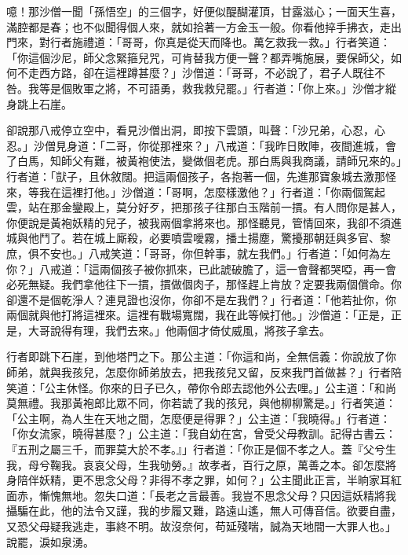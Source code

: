 噫！那沙僧一聞「孫悟空」的三個字，好便似醍醐灌頂，甘露滋心；一面天生喜，滿腔都是春；也不似聞得個人來，就如拾著一方金玉一般。你看他捽手拂衣，走出門來，對行者施禮道：「哥哥，你真是從天而降也。萬乞救我一救。」行者笑道：「你這個沙尼，師父念緊箍兒咒，可肯替我方便一聲？都弄嘴施展，要保師父，如何不走西方路，卻在這裡蹲甚麼？」沙僧道：「哥哥，不必說了，君子人既往不咎。我等是個敗軍之將，不可語勇，救我救兒罷。」行者道：「你上來。」沙僧才縱身跳上石崖。

卻說那八戒停立空中，看見沙僧出洞，即按下雲頭，叫聲：「沙兄弟，心忍，心忍。」沙僧見身道：「二哥，你從那裡來？」八戒道：「我昨日敗陣，夜間進城，會了白馬，知師父有難，被黃袍使法，變做個老虎。那白馬與我商議，請師兄來的。」行者道：「獃子，且休敘闊。把這兩個孩子，各抱著一個，先進那寶象城去激那怪來，等我在這裡打他。」沙僧道：「哥啊，怎麼樣激他？」行者道：「你兩個駕起雲，站在那金鑾殿上，莫分好歹，把那孩子往那白玉階前一摜。有人問你是甚人，你便說是黃袍妖精的兒子，被我兩個拿將來也。那怪聽見，管情回來，我卻不須進城與他鬥了。若在城上廝殺，必要噴雲噯霧，播土揚塵，驚擾那朝廷與多官、黎庶，俱不安也。」八戒笑道：「哥哥，你但幹事，就左我們。」行者道：「如何為左你？」八戒道：「這兩個孩子被你抓來，已此諕破膽了，這一會聲都哭啞，再一會必死無疑。我們拿他往下一摜，摜做個肉子，那怪趕上肯放？定要我兩個償命。你卻還不是個乾淨人？連見證也沒你，你卻不是左我們？」行者道：「他若扯你，你兩個就與他打將這裡來。這裡有戰場寬闊，我在此等候打他。」沙僧道：「正是，正是，大哥說得有理，我們去來。」他兩個才倚仗威風，將孩子拿去。

行者即跳下石崖，到他塔門之下。那公主道：「你這和尚，全無信義：你說放了你師弟，就與我孩兒，怎麼你師弟放去，把我孩兒又留，反來我門首做甚？」行者陪笑道：「公主休怪。你來的日子已久，帶你令郎去認他外公去哩。」公主道：「和尚莫無禮。我那黃袍郎比眾不同，你若諕了我的孩兒，與他柳柳驚是。」行者笑道：「公主啊，為人生在天地之間，怎麼便是得罪？」公主道：「我曉得。」行者道：「你女流家，曉得甚麼？」公主道：「我自幼在宮，曾受父母教訓。記得古書云：『五刑之屬三千，而罪莫大於不孝。』」行者道：「你正是個不孝之人。蓋『父兮生我，母兮鞠我。哀哀父母，生我劬勞。』故孝者，百行之原，萬善之本。卻怎麼將身陪伴妖精，更不思念父母？非得不孝之罪，如何？」公主聞此正言，半晌家耳紅面赤，慚愧無地。忽失口道：「長老之言最善。我豈不思念父母？只因這妖精將我攝騙在此，他的法令又謹，我的步履又難，路遠山遙，無人可傳音信。欲要自盡，又恐父母疑我逃走，事終不明。故沒奈何，苟延殘喘，誠為天地間一大罪人也。」說罷，淚如泉湧。

